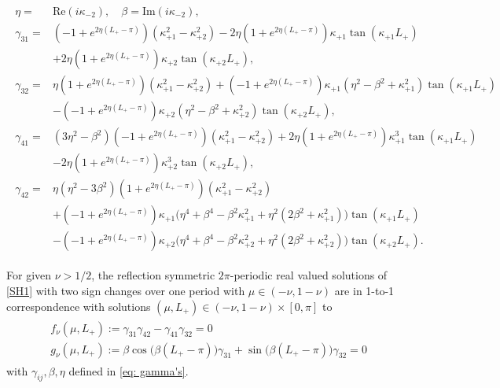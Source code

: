\documentclass[10pt,a4paper]{amsart}
\begin{document}
	\begin{align} \label{eq: gamma's}
		\begin{split}
		\eta = & \mathrm{Re}(i \kappa_{-2}), \quad \beta = \mathrm{Im}(i \kappa_{-2}),\\
			\gamma_{31} =& (-1 + e^{2 \eta (L_+ -\pi)}) (\kappa_{+1}^2 - \kappa_{+2}^2)-2 \eta (1 + e^{2 \eta (L_+ -\pi)}) \kappa_{+1} \tan(\kappa_{+1} L_+) \\
			&  +2 \eta (1 + e^{2 \eta (L_+ -\pi)}) \kappa_{+2} \tan(\kappa_{+2} L_+), \\
			\gamma_{32} =& \eta (1 + e^{2 \eta (L_+ -\pi)}) (\kappa_{+1}^2 - \kappa_{+2}^2) + (-1 + e^{2 \eta (L_+ -\pi)}) \kappa_{+1} (\eta^2 - \beta^2 + \kappa_{+1}^2) \tan(\kappa_{+1} L_+) \\
			& - (-1 + e^{2 \eta (L_+ -\pi)}) \kappa_{+2} (\eta^2 - \beta^2 + \kappa_{+2}^2) \tan(\kappa_{+2} L_+), \\
			\gamma_{41} =& (3 \eta^2 - \beta^2)(-1 + e^{2 \eta (L_+ -\pi)})(\kappa_{+1}^2 - \kappa_{+2}^2) +2 \eta (1 + e^{2 \eta (L_+ -\pi)}) \kappa_{+1}^3 \tan(\kappa_{+1} L_+) \\
			& -2 \eta (1 + e^{2 \eta (L_+ -\pi)}) \kappa_{+2}^3 \tan(\kappa_{+2} L_+), \\
			\gamma_{42} =& \eta (\eta^2 -3\beta^2) (1 + e^{2 \eta (L_+ -\pi)}) (\kappa_{+1}^2 - \kappa_{+2}^2) \\
			& + (-1 + e^{2 \eta (L_+ -\pi)}) \kappa_{+1} \big( \eta^4 + \beta^4 -\beta^2 \kappa_{+1}^2 + \eta^2 (2\beta^2 + \kappa_{+1}^2) \big) \tan(\kappa_{+1} L_+) \\
			& - (-1 + e^{2 \eta (L_+ -\pi)}) \kappa_{+2} \big( \eta^4 + \beta^4 -\beta^2 \kappa_{+2}^2 + \eta^2 (2\beta^2 + \kappa_{+2}^2) \big) \tan(\kappa_{+2} L_+).
		\end{split}
	\end{align} 

	\begin{theorem}\label{theorem: reduced system nu>1/2}
For given $\nu > 1/2$, the reflection symmetric $2\pi$-periodic real valued solutions of \eqref{SH1} with two sign changes over one period with $\mu\in (-\nu,1-\nu)$  are in 1-to-1 correspondence with solutions $(\mu,L_+)\in (-\nu,1-\nu)\times [0,\pi]$ to 
		\begin{align}
			\begin{split}\label{reduced system}
				&f_\nu (\mu,L_+) := \gamma_{31} \gamma_{42} - \gamma_{41} \gamma_{32} = 0 \\
				&g_\nu (\mu,L_+) := \beta \cos\big(\beta (L_+ -\pi)\big) \gamma_{31} + \sin\big(\beta (L_+ - \pi)\big) \gamma_{32} = 0
			\end{split}
		\end{align}
		with $\gamma_{ij}, \beta, \eta$ defined in \eqref{eq: gamma's}.
\end{theorem}
\end{document}
